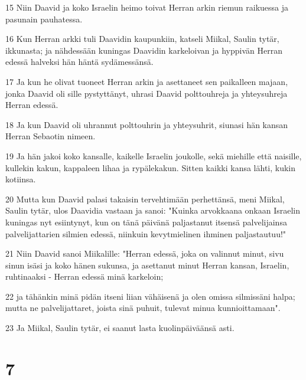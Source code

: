\par 15 Niin Daavid ja koko Israelin heimo toivat Herran arkin riemun raikuessa ja pasunain pauhatessa.
\par 16 Kun Herran arkki tuli Daavidin kaupunkiin, katseli Miikal, Saulin tytär, ikkunasta; ja nähdessään kuningas Daavidin karkeloivan ja hyppivän Herran edessä halveksi hän häntä sydämessänsä.
\par 17 Ja kun he olivat tuoneet Herran arkin ja asettaneet sen paikalleen majaan, jonka Daavid oli sille pystyttänyt, uhrasi Daavid polttouhreja ja yhteysuhreja Herran edessä.
\par 18 Ja kun Daavid oli uhrannut polttouhrin ja yhteysuhrit, siunasi hän kansan Herran Sebaotin nimeen.
\par 19 Ja hän jakoi koko kansalle, kaikelle Israelin joukolle, sekä miehille että naisille, kullekin kakun, kappaleen lihaa ja rypälekakun. Sitten kaikki kansa lähti, kukin kotiinsa.
\par 20 Mutta kun Daavid palasi takaisin tervehtimään perhettänsä, meni Miikal, Saulin tytär, ulos Daavidia vastaan ja sanoi: "Kuinka arvokkaana onkaan Israelin kuningas nyt esiintynyt, kun on tänä päivänä paljastanut itsensä palvelijainsa palvelijattarien silmien edessä, niinkuin kevytmielinen ihminen paljastautuu!"
\par 21 Niin Daavid sanoi Miikalille: "Herran edessä, joka on valinnut minut, sivu sinun isäsi ja koko hänen sukunsa, ja asettanut minut Herran kansan, Israelin, ruhtinaaksi - Herran edessä minä karkeloin;
\par 22 ja tähänkin minä pidän itseni liian vähäisenä ja olen omissa silmissäni halpa; mutta ne palvelijattaret, joista sinä puhuit, tulevat minua kunnioittamaan".
\par 23 Ja Miikal, Saulin tytär, ei saanut lasta kuolinpäiväänsä asti.

\chapter{7}

